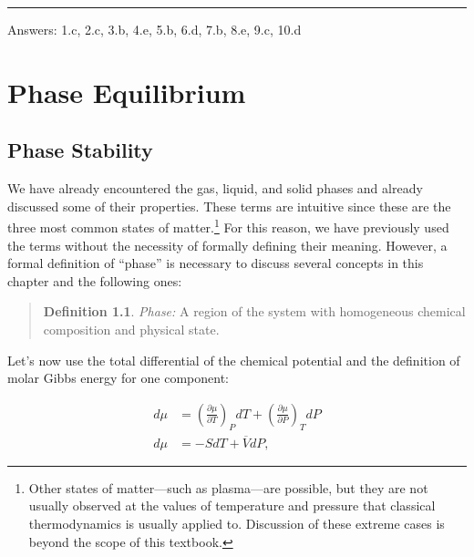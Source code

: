 \documentclass[
  9pt,
]{extbook}
\theoremstyle{definition}
\newtheorem{definition}{Definition}[chapter]
\theoremstyle{definition}
\theoremstyle{definition}
\theoremstyle{definition}
\theoremstyle{remark}
\begin{document}
\begin{center}\rule{0.5\linewidth}{0.5pt}\end{center}

Answers: 1.c, 2.c, 3.b, 4.e, 5.b, 6.d, 7.b, 8.e, 9.c, 10.d

\renewcommand*{\standardstate}{{-\kern-6pt{\ominus}\kern-6pt-}}

\chapter{Phase Equilibrium}\label{PhaseEquilibrium}

\section{Phase Stability}\label{phase-stability}

We have already encountered the gas, liquid, and solid phases and already discussed some of their properties. These terms are intuitive since these are the three most common states of matter.\footnote{Other states of matter---such as plasma---are possible, but they are not usually observed at the values of temperature and pressure that classical thermodynamics is usually applied to. Discussion of these extreme cases is beyond the scope of this textbook.} For this reason, we have previously used the terms without the necessity of formally defining their meaning. However, a formal definition of ``phase'' is necessary to discuss several concepts in this chapter and the following ones:

\begin{quote}
\begin{definition}
\protect\hypertarget{def:phasedef}{}\label{def:phasedef}\emph{Phase:} A region of the system with homogeneous chemical composition and physical state.
\end{definition}
\end{quote}

Let's now use the total differential of the chemical potential and the definition of molar Gibbs energy for one component:

\begin{equation}
\begin{aligned}
d\mu &= \left( \frac{\partial \mu}{\partial T} \right)_P dT + \left( \frac{\partial \mu}{\partial P} \right)_T dP \\
d\mu &= -SdT+\overline{V}dP,
\end{aligned}
\label{eq:muequal1}
\end{equation}
\end{document}
